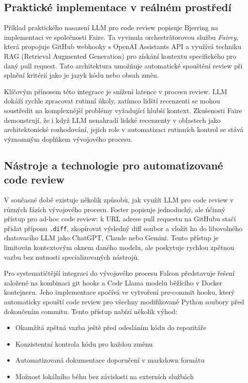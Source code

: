 \documentclass[12pt, a4paper]{article}
\begin{document}
\subsection{Praktické implementace v reálném prostředí}
Příklad praktického nasazení LLM pro code review popisuje Bjerring \cite{bjerring2024automated} na implementaci ve společnosti Faire. Ta vyvinula orchestrátorovou službu \textit{Fairey}, která propojuje GitHub webhooky s OpenAI Assistants API a využívá techniku RAG (Retrieval Augmented Generation) pro získání kontextu specifického pro daný pull request. Tato architektura umožňuje automatické spouštění review při splnění kritérií jako je jazyk kódu nebo obsah změn.

Klíčovým přínosem této integrace je snížení latence v procesu review. LLM dokáží rychle zpracovat rutinní úkoly, zatímco lidští recenzenti se mohou soustředit na komplexnější problémy vyžadující hlubší kontext. Zkušenosti Faire demonstrují, že i když LLM nenahradí lidské recenzenty v oblastech jako architektonické rozhodování, jejich role v automatizaci rutinních kontrol se stává významným doplňkem vývojového procesu.

\subsection{Nástroje a technologie pro automatizované code review}
V současné době existuje několik způsobů, jak využít LLM pro code review v různých fázích vývojového procesu. Foster \cite{graphite2023} popisuje jednoduchý, ale účinný přístup pro ad-hoc code review: k URL adrese pull requestu na GitHubu stačí přidat příponu \texttt{.diff}, zkopírovat výsledný diff soubor a vložit ho do libovolného chatovacího LLM jako ChatGPT, Claude nebo Gemini. Tento přístup je limitován kontextovým oknem daného modelu, ale poskytuje rychlou zpětnou vazbu bez nutnosti specializovaných nástrojů.

Pro systematičtější integraci do vývojového procesu Falcon \cite{falcon2024devto} představuje řešení založené na kombinaci git hooks a Code Llama modelu běžícího v Docker kontejneru. Jeho implementace spočívá ve vytvoření pre-commit hooku, který automaticky spouští code review pro všechny modifikované Python soubory před dokončením commitu. Tento přístup nabízí několik výhod:

\begin{itemize}
  \item Okamžitá zpětná vazba ještě před odesláním kódu do repozitáře
  \item Konzistentní kontrola kódu pro každou změnu
  \item Automatizovaná dokumentace doporučení v markdown formátu
  \item Možnost lokálního běhu bez závislosti na externích službách
\end{itemize}
\end{document}
